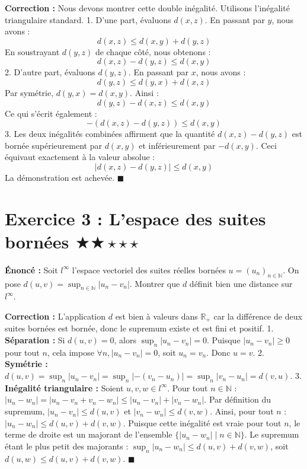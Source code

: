 \documentclass[11pt,a4paper]{article}
\begin{document}
\textbf{Correction :}
Nous devons montrer cette double inégalité. Utilisons l'inégalité triangulaire standard.
1. D'une part, évaluons $d(x, z)$. En passant par $y$, nous avons :
   $$ d(x, z) \le d(x, y) + d(y, z) $$
   En soustrayant $d(y, z)$ de chaque côté, nous obtenons :
   $$ d(x, z) - d(y, z) \le d(x, y) $$
2. D'autre part, évaluons $d(y, z)$. En passant par $x$, nous avons :
   $$ d(y, z) \le d(y, x) + d(x, z) $$
   Par symétrie, $d(y, x) = d(x, y)$. Ainsi :
   $$ d(y, z) - d(x, z) \le d(x, y) $$
   Ce qui s'écrit également :
   $$ -(d(x, z) - d(y, z)) \le d(x, y) $$
3. Les deux inégalités combinées affirment que la quantité $d(x, z) - d(y, z)$ est bornée supérieurement par $d(x, y)$ et inférieurement par $-d(x, y)$.
   Ceci équivaut exactement à la valeur absolue :
   $$ |d(x, z) - d(y, z)| \le d(x, y) $$
La démonstration est achevée. $\blacksquare$


\section*{Exercice 3 : L'espace des suites bornées \quad $\bigstar\bigstar\star\star\star$}

\textbf{Énoncé :}
Soit $l^\infty$ l'espace vectoriel des suites réelles bornées $u = (u_n)_{n \in \mathbb{N}}$.
On pose $d(u, v) = \sup_{n \in \mathbb{N}} |u_n - v_n|$.
Montrer que $d$ définit bien une distance sur $l^\infty$.

\textbf{Correction :}
L'application $d$ est bien à valeurs dans $\mathbb{R}_+$ car la différence de deux suites bornées est bornée, donc le supremum existe et est fini et positif.
1. \textbf{Séparation :}
   Si $d(u, v) = 0$, alors $\sup_{n} |u_n - v_n| = 0$. Puisque $|u_n - v_n| \ge 0$ pour tout $n$, cela impose $\forall n, |u_n - v_n| = 0$, soit $u_n = v_n$. Donc $u = v$.
2. \textbf{Symétrie :}
   $d(u, v) = \sup_{n} |u_n - v_n| = \sup_{n} |-(v_n - u_n)| = \sup_{n} |v_n - u_n| = d(v, u)$.
3. \textbf{Inégalité triangulaire :}
   Soient $u, v, w \in l^\infty$. Pour tout $n \in \mathbb{N}$ :
   $|u_n - w_n| = |u_n - v_n + v_n - w_n| \le |u_n - v_n| + |v_n - w_n|$.
   Par définition du supremum, $|u_n - v_n| \le d(u, v)$ et $|v_n - w_n| \le d(v, w)$.
   Ainsi, pour tout $n$ :
   $|u_n - w_n| \le d(u, v) + d(v, w)$.
   Puisque cette inégalité est vraie pour tout $n$, le terme de droite est un majorant de l'ensemble $\{|u_n - w_n| \mid n \in \mathbb{N}\}$. Le supremum étant le plus petit des majorants :
   $\sup_{n} |u_n - w_n| \le d(u, v) + d(v, w)$, soit $d(u, w) \le d(u, v) + d(v, w)$. $\blacksquare$
\end{document}
